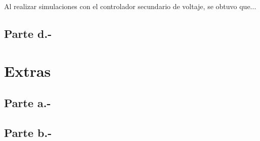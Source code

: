 Al realizar simulaciones con el controlador secundario de voltaje, se obtuvo que...

\subsection{Parte d.-}



\section{Extras}

\subsection{Parte a.-}



\subsection{Parte b.-}



